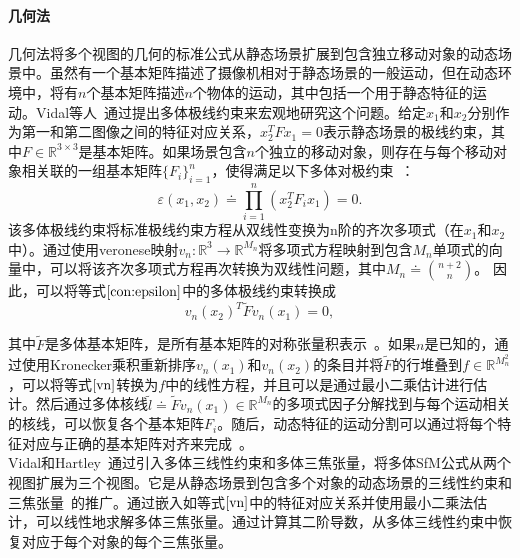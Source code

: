 \paragraph{几何法}
几何法将多个视图的几何的标准公式从静态场景扩展到包含独立移动对象的动态场景中。虽然有一个基本矩阵描述了摄像机相对于静态场景的一般运动，但在动态环境中，将有$n$个基本矩阵描述$n$个物体的运动，其中包括一个用于静态特征的运动。Vidal等人~\cite{vidal2006two}通过提出多体极线约束来宏观地研究这个问题。给定$x_1$和$x_2$分别作为第一和第二图像之间的特征对应关系，$x_2^TFx_1=0$表示静态场景的极线约束，其中$F\in{\mathbb{R}^{3\times3}}$是基本矩阵。如果场景包含$n$个独立的移动对象，则存在与每个移动对象相关联的一组基本矩阵$\{F_i\}_{i=1}^n$，使得满足以下多体对极约束~\cite{vidal2002segmentation}：
\begin{equation}\label{con:epsilon}
\varepsilon(x_1,x_2)\doteq\prod_{i=1}^n(x_2^TF_ix_1)=0.
\end{equation}
该多体极线约束将标准极线约束方程从双线性变换为n阶的齐次多项式（在$x_1$和$x_2$中）。通过使用veronese映射$v_n:\mathbb{R}^3\to\mathbb{R}^{M_n}$将多项式方程映射到包含$M_n$单项式的向量中，可以将该齐次多项式方程再次转换为双线性问题，其中$M_n\doteq\binom{n+2}{n}$。 因此，可以将等式\(\ref{con:epsilon}\)中的多体极线约束转换成
\begin{equation}\label{vn}
v_n(x_2)^T\tilde{F}v_n(x_1)=0,
\end{equation}

其中$\tilde{F}$是多体基本矩阵，是所有基本矩阵的对称张量积表示~\cite{vidal2006two,vidal2002segmentation}。如果$n$是已知的，通过使用Kronecker乘积重新排序$v_n(x_1)$和$v_n(x_2)$的条目并将$\tilde{F}$的行堆叠到$f\in{\mathbb{R}^{M_n^2}}$，可以将等式\(\ref{vn}\)转换为$f$中的线性方程，并且可以是通过最小二乘估计进行估计。然后通过多体核线$\tilde{l}\doteq\tilde{F}v_n(x_1)\in{\mathbb{R}^{M_n}}$的多项式因子分解找到与每个运动相关的核线，可以恢复各个基本矩阵$F_i$。随后，动态特征的运动分割可以通过将每个特征对应与正确的基本矩阵对齐来完成~\cite{vidal2002segmentation}。\\

Vidal和Hartley~\cite{vidal2007three}通过引入多体三线性约束和多体三焦张量，将多体SfM公式从两个视图扩展为三个视图。它是从静态场景到包含多个对象的动态场景的三线性约束和三焦张量~\cite{hartley2000multiple,torr1997robust}的推广。通过嵌入如等式\(\ref{vn}\)中的特征对应关系并使用最小二乘法估计，可以线性地求解多体三焦张量。通过计算其二阶导数，从多体三线性约束中恢复对应于每个对象的每个三焦张量。\\

